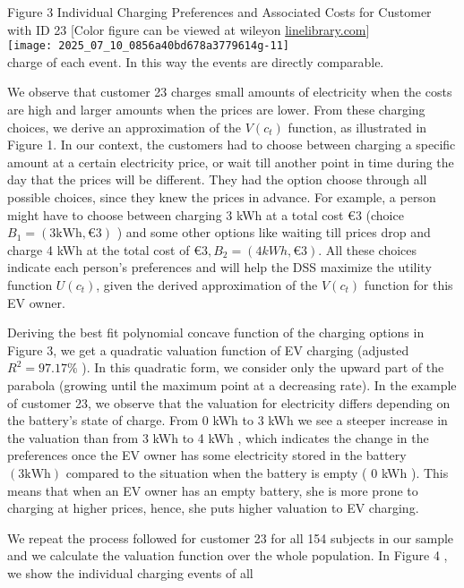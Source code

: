 \documentclass[10pt]{article}
\begin{document}
Figure 3 Individual Charging Preferences and Associated Costs for Customer with ID 23 [Color figure can be viewed at wileyon \href{http://linelibrary.com}{linelibrary.com}]\\
\texttt{[image: 2025\_07\_10\_0856a40bd678a3779614g-11]}\\
charge of each event. In this way the events are directly comparable.

We observe that customer 23 charges small amounts of electricity when the costs are high and larger amounts when the prices are lower. From these charging choices, we derive an approximation of the $V\left(c_{t}\right)$ function, as illustrated in Figure 1. In our context, the customers had to choose between charging a specific amount at a certain electricity price, or wait till another point in time during the day that the prices will be different. They had the option choose through all possible choices, since they knew the prices in advance. For example, a person might have to choose between charging 3 kWh at a total cost $€ 3$ (choice $B_{1}=(3 \mathrm{kWh}, € 3)$ ) and some other options like waiting till prices drop and charge 4 kWh at the total cost of $€ 3, B_{2}=(4 k W h, € 3)$. All these choices indicate each person's preferences and will help the DSS maximize the utility function $U\left(c_{t}\right)$, given the derived approximation of the $V\left(c_{t}\right)$ function for this EV owner.

Deriving the best fit polynomial concave function of the charging options in Figure 3, we get a quadratic valuation function of EV charging (adjusted $R^{2}=97.17 \%$ ). In this quadratic form, we consider only the upward part of the parabola (growing until the maximum point at a decreasing rate). In the example of customer 23, we observe that the valuation for electricity differs depending on the battery's state of charge. From 0 kWh to 3 kWh we see a steeper increase in the valuation than from 3 kWh to 4 kWh , which indicates the change in the preferences once the EV owner has some electricity stored in the battery $(3 \mathrm{kWh})$ compared to the situation when the battery is empty ( 0 kWh ). This means that when an EV owner has an empty battery, she is more prone to charging at higher prices, hence, she puts higher valuation to EV charging.

We repeat the process followed for customer 23 for all 154 subjects in our sample and we calculate the valuation function over the whole population. In Figure 4 , we show the individual charging events of all
\end{document}
